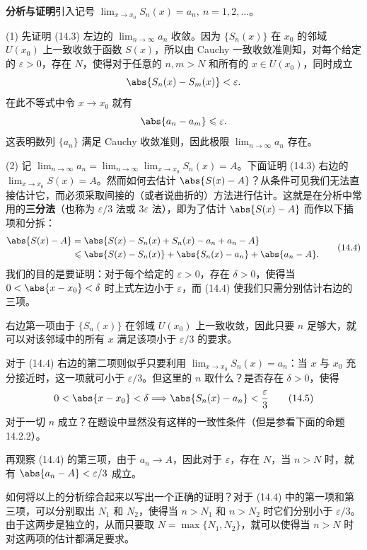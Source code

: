 \textbf{分析与证明}\quad 引入记号 $\displaystyle\lim_{x\to x_0}S_n(x)=a_n,\ n=1,2,\ldots$。

(1) 先证明 (14.3) 左边的 $\displaystyle\lim_{n\to\infty}a_n$ 收敛。因为 $\{S_n(x)\}$ 在 $x_0$ 的邻域 $U(x_0)$ 上一致收敛于函数 $S(x)$，所以由 Cauchy 一致收敛准则知，对每个给定的 $\varepsilon>0$，存在 $N$，使得对于任意的 $n,m>N$ 和所有的 $x\in U(x_0)$，同时成立
\[
  \abs{S_n(x)-S_m(x)}<\varepsilon.
\]
在此不等式中令 $x\to x_0$ 就有
\[
  \abs{a_n-a_m}\leqslant\varepsilon.
\]
这表明数列 $\{a_n\}$ 满足 Cauchy 收敛准则，因此极限 $\displaystyle\lim_{n\to\infty}a_n$ 存在。

(2) 记 $\displaystyle\lim_{n\to\infty}a_n=\lim_{n\to\infty}\lim_{x\to x_0}S_n(x)=A$。下面证明 (14.3) 右边的 $\displaystyle\lim_{x\to x_0}S(x)=A$。然而如何去估计 $\abs{S(x)-A}$？从条件可见我们无法直接估计它，而必须采取间接的（或者说曲折的）方法进行估计。这就是在分析中常用的\textbf{三分法}（也称为 $\varepsilon/3$ 法或 $3\varepsilon$ 法），即为了估计 $\abs{S(x)-A}$ 而作以下插项和分拆：
\begin{equation}
\begin{aligned}
  \abs{S(x)-A}
  &=\abs{S(x)-S_n(x)+S_n(x)-a_n+a_n-A}\\
  &\leqslant\abs{S(x)-S_n(x)}+\abs{S_n(x)-a_n}+\abs{a_n-A}.
\end{aligned}
\tag{14.4}
\label{eq:14.4}
\end{equation}
我们的目的是要证明：对于每个给定的 $\varepsilon>0$，存在 $\delta>0$，使得当 $0<\abs{x-x_0}<\delta$ 时上式左边小于 $\varepsilon$，而 (14.4) 使我们只需分别估计右边的三项。

右边第一项由于 $\{S_n(x)\}$ 在邻域 $U(x_0)$ 上一致收敛，因此只要 $n$ 足够大，就可以对该邻域中的所有 $x$ 满足该项小于 $\varepsilon/3$ 的要求。

对于 (14.4) 右边的第二项则似乎只要利用 $\displaystyle\lim_{x\to x_0}S_n(x)=a_n$：当 $x$ 与 $x_0$ 充分接近时，这一项就可小于 $\varepsilon/3$。但这里的 $n$ 取什么？是否存在 $\delta>0$，使得
\begin{equation}
  0<\abs{x-x_0}<\delta\Longrightarrow\abs{S_n(x)-a_n}<\frac\varepsilon3
  \tag{14.5}
  \label{eq:14.5}
\end{equation}
对于一切 $n$ 成立？在题设中显然没有这样的一致性条件（但是参看下面的命题 14.2.2）。

再观察 (14.4) 的第三项，由于 $a_n\to A$，因此对于 $\varepsilon$，存在 $N$，当 $n>N$ 时，就有 $\abs{a_n-A}<\varepsilon/3$ 成立。

如何将以上的分析综合起来以写出一个正确的证明？对于 (14.4) 中的第一项和第三项，可以分别取出 $N_1$ 和 $N_2$，使得当 $n>N_1$ 和 $n>N_2$ 时它们分别小于 $\varepsilon/3$。由于这两步是独立的，从而只要取 $N=\max\{N_1,N_2\}$，就可以使得当 $n>N$ 时对这两项的估计都满足要求。


